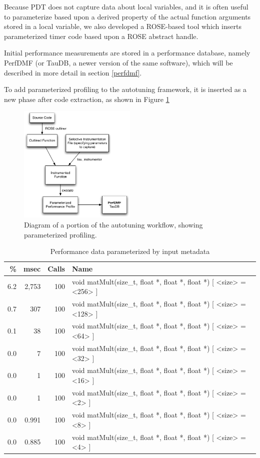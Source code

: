 \documentclass[msthesis,justified,copyright,final,numbers,sort&compress,
gsmodern,amstex,natbib]{uothesis}
\begin{document}
Because PDT does not capture data about local variables, and it is often useful to parameterize based upon a derived property of the actual function arguments stored in a local variable, we also developed a ROSE-based tool which inserts parameterized timer code based upon a ROSE abstract handle.

Initial performance measurements are stored in a performance database, namely PerfDMF (or TauDB, a newer version of the same software), which will be described in more detail in section \ref{perfdmf}.

To add parameterized profiling to the autotuning framework, it is inserted as a new phase after code extraction, as shown in Figure \ref{fig:instrument}

\begin{figure}[tbp]
\centering
\includegraphics[width=0.5\textwidth]{instrument.pdf}
\caption{Diagram of a portion of the autotuning workflow, showing parameterized profiling.}
\label{fig:instrument}
\end{figure}

\begin{table}[tbp]
\begin{center}
\begin{tabular}{ r | r | r | l }
\hline
\% & msec & Calls &  Name \\
\hline
6.2&2,753&100&void matMult(size\_t, float *, float *, float *) [ <size> = <256> ] \\
0.7&  307&100&void matMult(size\_t, float *, float *, float *) [ <size> = <128> ] \\
0.1&   38&100&void matMult(size\_t, float *, float *, float *) [ <size> = <64> ] \\
0.0&    7&100&void matMult(size\_t, float *, float *, float *) [ <size> = <32> ] \\
0.0&    1&100&void matMult(size\_t, float *, float *, float *) [ <size> = <16> ] \\
0.0&    1&100&void matMult(size\_t, float *, float *, float *) [ <size> = <2> ] \\
0.0&0.991&100&void matMult(size\_t, float *, float *, float *) [ <size> = <8> ] \\
0.0&0.885&100&void matMult(size\_t, float *, float *, float *) [ <size> = <4> ] \\
\hline
\end{tabular}
\end{center}
\caption{Performance data parameterized by input metadata}
\label{tab:parameterized}
\end{table}
\end{document}
